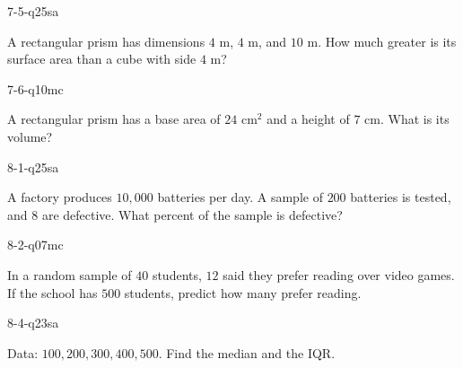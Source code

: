 \begin{practiceQuestion}{7-5-q25}{sa}
\begin{questionText}
A rectangular prism has dimensions $4$ m, $4$ m, and $10$ m. How much greater is its surface area than a cube with side $4$ m?
\end{questionText}
\end{practiceQuestion}

\begin{practiceQuestion}{7-6-q10}{mc}
\begin{questionText}
A rectangular prism has a base area of $24$ cm$^2$ and a height of $7$ cm. What is its volume?
\end{questionText}
\end{practiceQuestion}

\begin{practiceQuestion}{8-1-q25}{sa}
\begin{questionText}
A factory produces $10{,}000$ batteries per day. A sample of $200$ batteries is tested, and $8$ are defective. What percent of the sample is defective?
\end{questionText}
\end{practiceQuestion}

\begin{practiceQuestion}{8-2-q07}{mc}
\begin{questionText}
In a random sample of $40$ students, $12$ said they prefer reading over video games. If the school has $500$ students, predict how many prefer reading.
\end{questionText}
\end{practiceQuestion}

\begin{practiceQuestion}{8-4-q23}{sa}
\begin{questionText}
Data: $100, 200, 300, 400, 500$. Find the median and the IQR.
\end{questionText}
\end{practiceQuestion}

